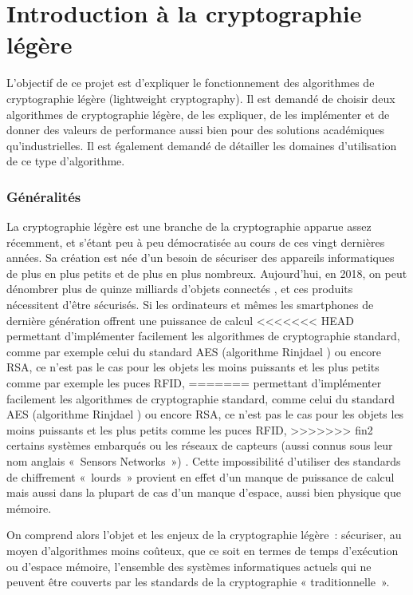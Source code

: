 \newpage
\part{Introduction à la cryptographie légère}

		L'objectif de ce projet est d'expliquer le fonctionnement des algorithmes de cryptographie légère (lightweight cryptography).
	Il est demandé de choisir deux algorithmes de cryptographie légère, de les expliquer,
	de les implémenter et de donner des valeurs de performance aussi bien pour des solutions académiques qu'industrielles.
	Il est également demandé de détailler les domaines d'utilisation de ce type d'algorithme.

	\section{Généralités}

			La cryptographie légère est une branche de la cryptographie apparue assez
		récemment, et s'étant peu à peu démocratisée au cours de ces vingt
		dernières années. Sa création est née d'un besoin de sécuriser des
		appareils informatiques de plus en plus petits et de plus en plus
		nombreux. Aujourd'hui, en 2018, on peut dénombrer  plus de  quinze
		milliards d'objets connectés \cite{renaud_developpement_2017}, et ces
		produits nécessitent d'être sécurisés. Si les ordinateurs et mêmes les
		smartphones de dernière génération offrent une puissance de calcul
<<<<<<< HEAD
		permettant d'implémenter facilement les algorithmes de cryptographie
		standard, comme par exemple celui du standard AES (algorithme Rinjdael
		\cite{AES-FIPS}) ou encore RSA, ce n'est pas le cas pour les objets les
		moins puissants et les plus petits comme par exemple les puces RFID,
=======
		permettant d’implémenter facilement les algorithmes de cryptographie
		standard, comme celui du standard AES (algorithme Rinjdael
		\cite{AES-FIPS}) ou encore RSA, ce n’est pas le cas pour les objets les
		moins puissants et les plus petits comme les puces RFID,
>>>>>>> fin2
		certains systèmes embarqués ou les réseaux de capteurs (aussi connus sous
		leur nom anglais « Sensors Networks ») \cite{Report_light}. Cette
		impossibilité d'utiliser des standards de chiffrement « lourds » provient
		en effet d'un manque de puissance de calcul mais aussi dans la plupart de
		cas d'un manque d'espace, aussi bien physique que mémoire.

			On comprend alors l'objet et les enjeux de la cryptographie légère :
		sécuriser, au moyen d'algorithmes moins coûteux, que ce soit en termes de
		temps d'exécution ou d'espace mémoire, l'ensemble des systèmes informatiques
		actuels qui ne peuvent être couverts par les standards de la cryptographie «
		traditionnelle ».

